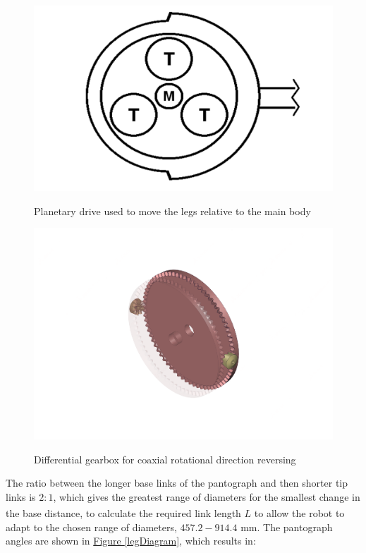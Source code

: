 \documentclass[11pt]{article}		%
\newlength{\imageheight}	 %
\newcommand{\supercite}[1]{\textsuperscript{\cite{#1}}}		%
\newcommand{\figref}[1]{\hyperref[#1]{Figure \ref*{#1}}}    %
\begin{document}
			\begin{figure}[h]
				\centering
				\begin{multicols}{2}
					\includegraphics[height=\imageheight]{planetaryDrive}
					\caption{Planetary drive used to move the legs relative to the main body}
					\label{planetaryDrive}
					\columnbreak
					\includegraphics[height=\imageheight]{diffGearbox}
					\caption{Differential gearbox for coaxial rotational direction reversing}
					\label{diffGearbox}
				\end{multicols}
			\end{figure}
			
			The ratio between the longer base links of the pantograph and then shorter tip links is $2:1$, which gives the greatest range of diameters for the smallest change in the base distance\supercite{okada1987mogrer}, to calculate the required link length $L$ to allow the robot to adapt to the chosen range of diameters, $457.2 - 914.4$ mm.
			The pantograph angles are shown in \figref{legDiagram}, which results in:
			
\end{document}
